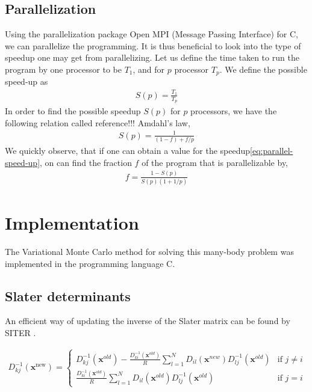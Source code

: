 \documentclass[11pt]{article}
\newcommand{\husk}[1]{\color{red} #1 \color{black}}
\newcommand{\CC}{C\nolinebreak\hspace{-.05em}\raisebox{.4ex}{\tiny\bf +}\nolinebreak\hspace{-.10em}\raisebox{.4ex}{\tiny\bf +}}
\def\CC{{C\nolinebreak[4]\hspace{-.05em}\raisebox{.4ex}{\tiny\bf ++}}}
\begin{document}
\subsection{Parallelization}
Using the parallelization package Open MPI (Message Passing Interface) for \CC, we can parallelize the programming. It is thus beneficial to look into the type of speedup one may get from parallelizing. Let us define the time taken to run the program by one processor to be $T_1$, and for $p$ processor $T_p$. We define the possible speed-up as
\begin{align}
	S(p) = \frac{T_1}{T_p}
	\label{eq:parallel-speed-up}
\end{align}
In order to find the possible speedup $S(p)$ for $p$ processors, we have the following relation called \husk{reference!!!} Amdahl's law,
\begin{align}
	S(p) = \frac{1}{(1-f) + f/p}
	\label{eq:amdahls-law}
\end{align}
We quickly observe, that if one can obtain a value for the speedup\eqref{eq:parallel-speed-up}, on can find the fraction $f$ of the program that is parallelizable by,
\begin{align}
	f = \frac{1-S(p)}{S(p)(1+1/p)}
	\label{eq:f-parallelizable-fraction}
\end{align}

\section{Implementation}
The Variational Monte Carlo method for solving this many-body problem was implemented in the programming language \CC. 

\subsection{Slater determinants}
An efficient way of updating the inverse of the Slater matrix can be found by \husk{SITER}. 

\begin{align}
D_{kj}^{-1}(\mathbf{x}^\text{new}) = \left\{
\begin{array}{ll}
	D_{kj}^{-1}(\mathbf{x}^{old}) - \frac{D_{ki}^{-1}(\mathbf{x}^{old})}{R}\sum^N_{l=1} D_{il}(\mathbf{x}^{new})D^{-1}_{lj}(\mathbf{x}^{old}) & \text{if } j\neq i \\
	\frac{D_{ki}^{-1}(\mathbf{x}^{old})}{R}\sum^N_{l=1} D_{il}(\mathbf{x}^{old})D^{-1}_{lj}(\mathbf{x}^{old}) & \text{if } j = i
\end{array}
\right.
\end{align}
\end{document}
